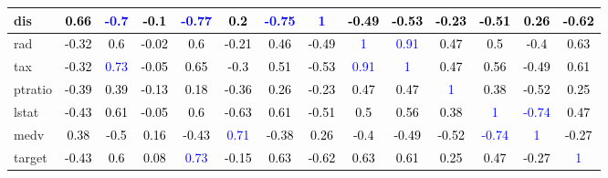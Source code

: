 \documentclass[]{article}
\begin{document}
\begin{table}[H]
\begin{tabular}{l|c|c|c|c|c|c|c|c|c|c|c|c|c}
\hline
dis & \textcolor{black}{0.66} & \textcolor{blue}{-0.7} & \textcolor{black}{-0.1} & \textcolor{blue}{-0.77} & \textcolor{black}{0.2} & \textcolor{blue}{-0.75} & \textcolor{blue}{1} & \textcolor{black}{-0.49} & \textcolor{black}{-0.53} & \textcolor{black}{-0.23} & \textcolor{black}{-0.51} & \textcolor{black}{0.26} & \textcolor{black}{-0.62}\\
\hline
rad & \textcolor{black}{-0.32} & \textcolor{black}{0.6} & \textcolor{black}{-0.02} & \textcolor{black}{0.6} & \textcolor{black}{-0.21} & \textcolor{black}{0.46} & \textcolor{black}{-0.49} & \textcolor{blue}{1} & \textcolor{blue}{0.91} & \textcolor{black}{0.47} & \textcolor{black}{0.5} & \textcolor{black}{-0.4} & \textcolor{black}{0.63}\\
\hline
tax & \textcolor{black}{-0.32} & \textcolor{blue}{0.73} & \textcolor{black}{-0.05} & \textcolor{black}{0.65} & \textcolor{black}{-0.3} & \textcolor{black}{0.51} & \textcolor{black}{-0.53} & \textcolor{blue}{0.91} & \textcolor{blue}{1} & \textcolor{black}{0.47} & \textcolor{black}{0.56} & \textcolor{black}{-0.49} & \textcolor{black}{0.61}\\
\hline
ptratio & \textcolor{black}{-0.39} & \textcolor{black}{0.39} & \textcolor{black}{-0.13} & \textcolor{black}{0.18} & \textcolor{black}{-0.36} & \textcolor{black}{0.26} & \textcolor{black}{-0.23} & \textcolor{black}{0.47} & \textcolor{black}{0.47} & \textcolor{blue}{1} & \textcolor{black}{0.38} & \textcolor{black}{-0.52} & \textcolor{black}{0.25}\\
\hline
lstat & \textcolor{black}{-0.43} & \textcolor{black}{0.61} & \textcolor{black}{-0.05} & \textcolor{black}{0.6} & \textcolor{black}{-0.63} & \textcolor{black}{0.61} & \textcolor{black}{-0.51} & \textcolor{black}{0.5} & \textcolor{black}{0.56} & \textcolor{black}{0.38} & \textcolor{blue}{1} & \textcolor{blue}{-0.74} & \textcolor{black}{0.47}\\
\hline
medv & \textcolor{black}{0.38} & \textcolor{black}{-0.5} & \textcolor{black}{0.16} & \textcolor{black}{-0.43} & \textcolor{blue}{0.71} & \textcolor{black}{-0.38} & \textcolor{black}{0.26} & \textcolor{black}{-0.4} & \textcolor{black}{-0.49} & \textcolor{black}{-0.52} & \textcolor{blue}{-0.74} & \textcolor{blue}{1} & \textcolor{black}{-0.27}\\
\hline
target & \textcolor{black}{-0.43} & \textcolor{black}{0.6} & \textcolor{black}{0.08} & \textcolor{blue}{0.73} & \textcolor{black}{-0.15} & \textcolor{black}{0.63} & \textcolor{black}{-0.62} & \textcolor{black}{0.63} & \textcolor{black}{0.61} & \textcolor{black}{0.25} & \textcolor{black}{0.47} & \textcolor{black}{-0.27} & \textcolor{blue}{1}\\
\hline
\end{tabular}
\end{table}
\end{document}
